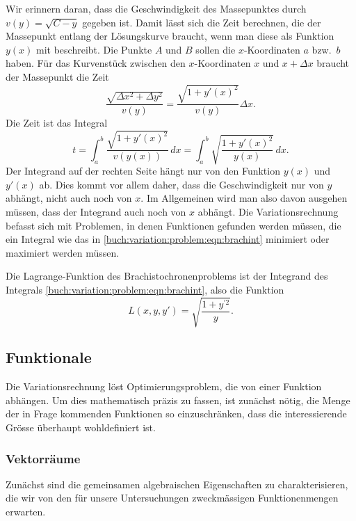 Wir erinnern daran, dass die Geschwindigkeit des Massepunktes durch
$v(y)=\sqrt{C-y}$ gegeben ist.
Damit lässt sich die Zeit berechnen, die der Massepunkt entlang der
Lösungskurve braucht, wenn man diese als Funktion $y(x)$ mit beschreibt.
Die Punkte $A$ und $B$ sollen die $x$-Koordinaten $a$ bzw.~$b$ haben.
Für das Kurvenstück zwischen den $x$-Koordinaten $x$ und $x+\Delta x$
braucht der Massepunkt die Zeit
\[
\frac{ \sqrt{\Delta x^2 + \Delta y^2} }{v(y)}
=
\frac{ \sqrt{1 + y'(x)^2} }{ v(y) } \Delta x.
\]
Die Zeit ist das Integral
\begin{equation}
t
=
\int_a^b \frac{\sqrt{1+y'(x)^2}}{v(y(x))}\,dx
=
\int_a^b \sqrt{\frac{1+y'(x)^2}{y(x)}}\,dx.
\label{buch:variation:problem:eqn:brachint}
\end{equation}
Der Integrand auf der rechten Seite hängt nur von den Funktion $y(x)$
und $y'(x)$ ab.
Dies kommt vor allem daher, dass die Geschwindigkeit nur von $y$ abhängt,
nicht auch noch von $x$.
Im Allgemeinen wird man also davon ausgehen müssen, dass der Integrand
auch noch von $x$ abhängt.
Die Variationsrechnung befasst sich mit Problemen, in denen Funktionen
gefunden werden müssen, die ein Integral wie das in
\eqref{buch:variation:problem:eqn:brachint}
minimiert oder maximiert werden müssen.

\begin{definition}
Die Lagrange-Funk\-tion des Brachistochronenproblems ist der
Integrand des Integrals
\eqref{buch:variation:problem:eqn:brachint},
%
also die Funktion
\[
L(x,y,y')
=
\sqrt{\frac{1+y^{\prime 2}}{y}}.
\]
\end{definition}

%
%
\subsection{Funktionale
\label{buch:variation:problem:subsection:funktionale}}
Die Variationsrechnung löst Optimierungsproblem, die von einer
Funktion abhängen.
Um dies mathematisch präzis zu fassen, ist zunächst nötig, die Menge
der in Frage kommenden Funktionen so einzuschränken, dass die interessierende
Grösse überhaupt wohldefiniert ist.

%
%
\subsubsection{Vektorräume}
Zunächst sind die gemeinsamen algebraischen Eigenschaften zu charakterisieren,
die wir von den für unsere Untersuchungen zweckmässigen Funktionenmengen
erwarten.

